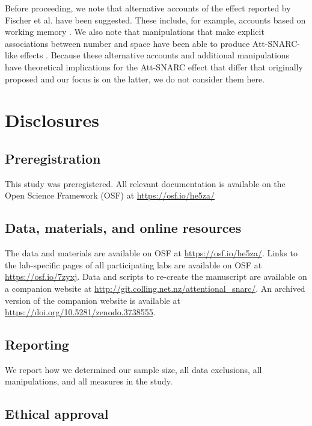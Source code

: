\documentclass[man,floatsintext]{apa6}
\theoremstyle{definition}
\theoremstyle{definition}
\theoremstyle{definition}
\theoremstyle{remark}
\begin{document}
Before proceeding, we note that alternative accounts of the effect
reported by Fischer et al. have been suggested. These include, for
example, accounts based on working memory \autocite{vanDijck2014}. We
also note that manipulations that make explicit associations between
number and space have been able to produce Att-SNARC-like effects
\autocite[e.g.,][experiment 3]{Fattorini2015}. Because these alternative
accounts and additional manipulations have theoretical implications for
the Att-SNARC effect that differ that originally proposed and our focus
is on the latter, we do not consider them here.

\section{Disclosures}\label{disclosures}

\subsection{Preregistration}\label{preregistration}

This study was preregistered. All relevant documentation is available on
the Open Science Framework (OSF) at \url{https://osf.io/he5za/}

\subsection{Data, materials, and online
resources}\label{data-materials-and-online-resources}

The data and materials are available on OSF at
\url{https://osf.io/he5za/}. Links to the lab-specific pages of all
participating labs are available on OSF at \url{https://osf.io/7zyxj}.
Data and scripts to re-create the manuscript are available on a
companion website at \url{http://git.colling.net.nz/attentional_snarc/}.
An archived version of the companion website is available at
\url{https://doi.org/10.5281/zenodo.3738555}.

\subsection{Reporting}\label{reporting}

We report how we determined our sample size, all data exclusions, all
manipulations, and all measures in the study.

\subsection{Ethical approval}\label{ethical-approval}
\end{document}

